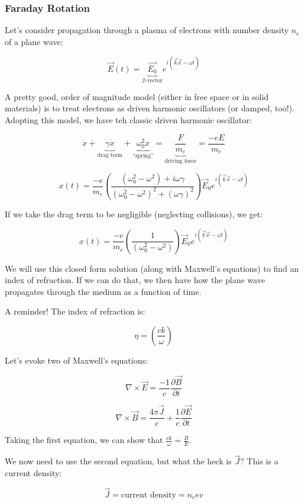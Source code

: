 \documentclass{article}
\def\Bfield{{\vec{B}}}
\def\Efield{{\vec {E}}}
\begin{document}
\subsubsection{Faraday Rotation}

Let's consider propagation through a plasma of electrons with number density $n_e$ of a plane wave:

$$
\Efield(t) = \underbrace{\vec{E_0}}_\text{2-vector} e^{i(\vec{k}\dot \vec{x} - \omega t)}
$$

A pretty good, order of magnitude model (either in free space or in solid materials) is to treat electrons as driven harmonic oscillators (or damped, too!). Adopting this model, we have teh classic driven harmonic oscillator:

$$
\ddot{x} + \underbrace{\gamma \dot{x}}_\text{drag term} + \underbrace{\omega_0^2 x}_\text{``spring''} = \underbrace{\frac{F}{m_e}}_\text{driving force} = \frac{-e E}{m_e}
$$

$$
x(t) = \frac{-e}{m_e}\left(\frac{\left(\omega_0^2 - \omega^2\right) + i\omega\gamma}{\left(\omega_0^2 - \omega^2\right)^2 + \left(\omega \gamma\right)^2}\right) \vec{E}_0 e^{i(\vec{k} \dot \vec{x} - \omega t)}
$$

If we take the drag term to be negligible (neglecting collisions), we get:

$$
x(t) = \frac{-e}{m_e}\left(\frac{1}{\left(\omega_0^2 - \omega^2\right)}\right) \vec{E}_0 e^{i(\vec{k} \dot \vec{x} - \omega t)}
$$

We will use this closed form solution (along with Maxwell's equations) to find an index of refraction. If we can do that, we then have how the plane wave propagates through the medium as a function of time.

A reminder! The index of refraction is:

$$
\eta = \left(\frac{c k}{\omega}\right)
$$

Let's evoke two of Maxwell's equations:

$$
\nabla \times \Efield = \frac{-1}{c}\frac{\partial \Bfield}{\partial t}
$$

$$
\nabla \times \Bfield = \frac{4\pi \vec{J}}{c} + \frac{1}{c}\frac{\partial \Efield}{\partial t}
$$

Taking the first equation, we can show that $\frac{ck}{\omega} = \frac{B}{E}$.

We now need to use the second equation, but what the heck is $\vec{J}$? This is a current density:

$$
\vec{J} = \text{current density} = n_e e v
$$
\end{document}

